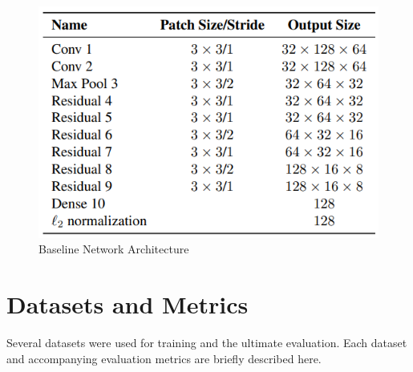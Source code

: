 \documentclass[10pt,twocolumn,letterpaper]{article}
\begin{document}
\begin{figure}[h!]
    \centering
    \includegraphics[width=0.9\linewidth]{docs/reports/figs/baseline_net.png}
    \caption{Baseline Network Architecture \cite{Wojke2018cosine}}
    \label{fig:baseline}
\end{figure}

\section{Datasets and Metrics}
Several datasets were used for training and the ultimate evaluation. Each dataset and accompanying evaluation metrics are briefly described here.
\end{document}
